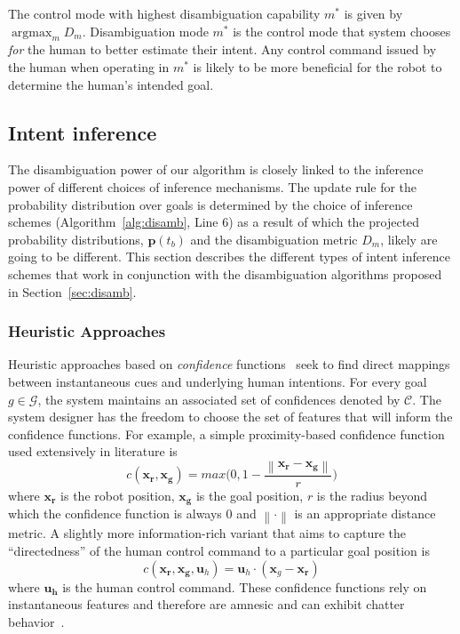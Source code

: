 \documentclass[conference]{IEEEtran}
\DeclareMathOperator*{\argmax}{argmax}
\newcommand{\norm}[1]{\left\lVert#1\right\rVert}
\begin{document}
The control mode with highest disambiguation capability $m^*$ is given by $\argmax_m D_m$. Disambiguation mode $m^*$ is the control mode that system chooses \textit{for} the human to better estimate their intent. Any control command issued by the human when operating in $m^*$ is likely to be more beneficial for the robot to determine the human's intended goal. 

\subsection{Intent inference}\label{ssec:inference}
  The disambiguation power of our algorithm is closely linked to the inference power of different choices of inference mechanisms. The update rule for the probability distribution over goals is determined by the choice of inference schemes (Algorithm~\ref{alg:disamb}, Line 6) as a result of which the projected probability distributions, $\boldsymbol{p}(t_b)$ and the disambiguation metric $D_m$, likely are going to be different. This section describes the different types of intent inference schemes that work in conjunction with the disambiguation algorithms proposed in Section~\ref{sec:disamb}.

\subsubsection{Heuristic Approaches}
Heuristic approaches based on \textit{confidence} functions~\citep{dragan2013policy} seek to find direct mappings between instantaneous cues and underlying human intentions. For every goal $g \in \mathcal{G}$, the system maintains an associated set of confidences denoted by $\mathcal{C}$. The system designer has the freedom to choose the set of features that will inform the confidence functions. For example, a simple proximity-based confidence function used extensively in literature is
\begin{equation}
c(\boldsymbol{x_r}, \boldsymbol{x_g}) = max\Big(0, 1 - \frac{\norm{\boldsymbol{x_r} - \boldsymbol{x_g}}}{r}\Big)
\end{equation}
where $\boldsymbol{x_r}$ is the robot position, $\boldsymbol{x_g}$ is the goal position, $r$ is the radius beyond which the confidence function is always 0 and $\norm{\cdot}$ is an appropriate distance metric. 
A slightly more information-rich variant that aims to capture the ``directedness'' of the human control command to a particular goal position is
\begin{equation*}
c({\boldsymbol{x_r},\boldsymbol{x_g}, \boldsymbol{u}_{h}}) = \boldsymbol{u}_h\cdot(\boldsymbol{x}_{g} - \boldsymbol{x_r})
\end{equation*}
where $\boldsymbol{u_h}$ is the human control command. These confidence functions rely on instantaneous features and therefore are amnesic and can exhibit chatter behavior~\citep{dragan2012formalizing}.
\end{document}
